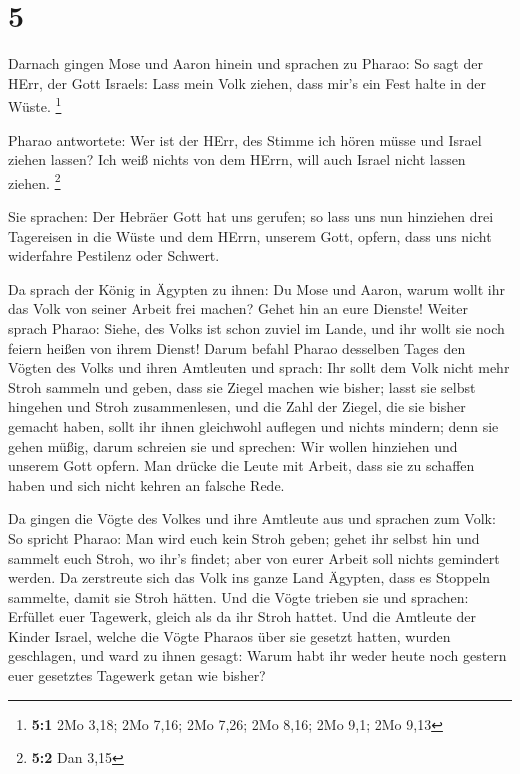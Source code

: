 \hypertarget{section-1}{%
\section{5}\label{section-1}}

 Darnach gingen Mose und Aaron hinein und sprachen zu
Pharao: So sagt der HErr, der Gott Israels: Lass mein Volk ziehen, dass
mir's ein Fest halte in der Wüste. \footnote{\textbf{5:1} 2Mo 3,18; 2Mo
  7,16; 2Mo 7,26; 2Mo 8,16; 2Mo 9,1; 2Mo 9,13}

 Pharao antwortete: Wer ist der HErr, des Stimme ich hören
müsse und Israel ziehen lassen? Ich weiß nichts von dem HErrn, will auch
Israel nicht lassen ziehen. \footnote{\textbf{5:2} Dan 3,15}

 Sie sprachen: Der Hebräer Gott hat uns gerufen; so lass uns
nun hinziehen drei Tagereisen in die Wüste und dem HErrn, unserem Gott,
opfern, dass uns nicht widerfahre Pestilenz oder Schwert.

 Da sprach der König in Ägypten zu ihnen: Du Mose und Aaron,
warum wollt ihr das Volk von seiner Arbeit frei machen? Gehet hin an
eure Dienste!  Weiter sprach Pharao: Siehe, des Volks ist
schon zuviel im Lande, und ihr wollt sie noch feiern heißen von ihrem
Dienst!  Darum befahl Pharao desselben Tages den Vögten des
Volks und ihren Amtleuten und sprach:  Ihr sollt dem Volk
nicht mehr Stroh sammeln und geben, dass sie Ziegel machen wie bisher;
lasst sie selbst hingehen und Stroh zusammenlesen,  und die
Zahl der Ziegel, die sie bisher gemacht haben, sollt ihr ihnen
gleichwohl auflegen und nichts mindern; denn sie gehen müßig, darum
schreien sie und sprechen: Wir wollen hinziehen und unserem Gott opfern.
 Man drücke die Leute mit Arbeit, dass sie zu schaffen haben
und sich nicht kehren an falsche Rede.

 Da gingen die Vögte des Volkes und ihre Amtleute aus und
sprachen zum Volk: So spricht Pharao: Man wird euch kein Stroh geben;
 gehet ihr selbst hin und sammelt euch Stroh, wo ihr's
findet; aber von eurer Arbeit soll nichts gemindert werden.
 Da zerstreute sich das Volk ins ganze Land Ägypten, dass
es Stoppeln sammelte, damit sie Stroh hätten.  Und die
Vögte trieben sie und sprachen: Erfüllet euer Tagewerk, gleich als da
ihr Stroh hattet.  Und die Amtleute der Kinder Israel,
welche die Vögte Pharaos über sie gesetzt hatten, wurden geschlagen, und
ward zu ihnen gesagt: Warum habt ihr weder heute noch gestern euer
gesetztes Tagewerk getan wie bisher?

